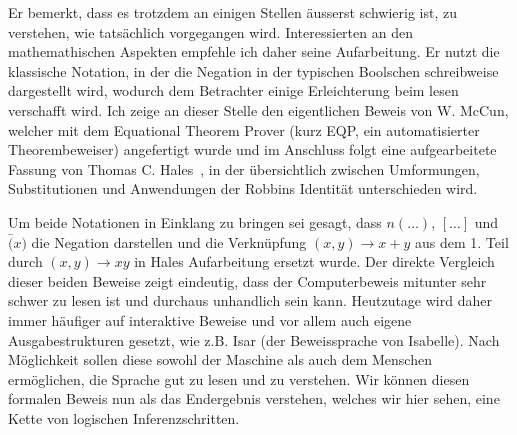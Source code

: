 Er bemerkt, dass es trotzdem an einigen Stellen äusserst schwierig ist, zu verstehen, wie tatsächlich vorgegangen wird.
Interessierten an den mathemathischen Aspekten empfehle ich daher seine Aufarbeitung.
Er nutzt die klassische Notation, in der die Negation in der typischen Boolschen schreibweise dargestellt wird, wodurch dem Betrachter einige Erleichterung beim lesen verschafft wird.
Ich zeige an dieser Stelle den eigentlichen Beweis von W. McCun, welcher mit dem Equational Theorem Prover (kurz EQP, ein automatisierter Theorembeweiser) angefertigt wurde und im Anschluss folgt eine aufgearbeitete Fassung von Thomas C. Hales~\cite{hales_formalproof}, in der übersichtlich zwischen Umformungen, Substitutionen und Anwendungen der Robbins Identität unterschieden wird.

Um beide Notationen in Einklang zu bringen sei gesagt, dass   $n(\ldots)$, $[\dots]$ und $\bar(x)$ die Negation darstellen und die Verknüpfung $(x,y) \rightarrow x + y$ aus dem 1. Teil durch $(x,y) \rightarrow xy$ in Hales Aufarbeitung ersetzt wurde.
Der direkte Vergleich dieser beiden Beweise zeigt eindeutig, dass der
Computerbeweis mitunter sehr schwer zu lesen ist und durchaus unhandlich sein
kann. Heutzutage wird daher immer häufiger auf interaktive Beweise und vor allem
auch eigene Ausgabestrukturen gesetzt, wie z.B. Isar (der Beweissprache von
Isabelle). Nach Möglichkeit sollen diese sowohl der Maschine als auch dem Menschen
ermöglichen, die Sprache gut zu lesen und zu verstehen.
Wir können diesen formalen Beweis nun als das Endergebnis verstehen, welches wir hier sehen, eine Kette von logischen Inferenzschritten.

